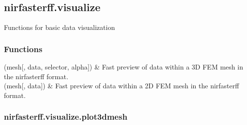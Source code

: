 \documentclass[letterpaper,10pt,english]{sphinxmanual}
\begin{document}
\subsection{nirfasterff.visualize}
\label{\detokenize{_autosummary/nirfasterff.visualize:module-nirfasterff.visualize}}\label{\detokenize{_autosummary/nirfasterff.visualize:nirfasterff-visualize}}\label{\detokenize{_autosummary/nirfasterff.visualize::doc}}
\sphinxAtStartPar
Functions for basic data visualization
\subsubsection*{Functions}


\begin{savenotes}\sphinxattablestart
\sphinxthistablewithglobalstyle
\sphinxthistablewithnovlinesstyle
\centering
\begin{tabulary}{\linewidth}[t]{}
\sphinxtoprule
\sphinxtableatstartofbodyhook
\sphinxAtStartPar
{\hyperref[\detokenize{_autosummary/nirfasterff.visualize.plot3dmesh:nirfasterff.visualize.plot3dmesh}]{}}(mesh{[}, data, selector, alpha{]})
&
\sphinxAtStartPar
Fast preview of data within a 3D FEM mesh in the nirfasterff format.
\\
\sphinxhline
\sphinxAtStartPar
{\hyperref[\detokenize{_autosummary/nirfasterff.visualize.plotimage:nirfasterff.visualize.plotimage}]{}}(mesh{[}, data{]})
&
\sphinxAtStartPar
Fast preview of data within a 2D FEM mesh in the nirfasterff format.
\\
\sphinxbottomrule
\end{tabulary}
\sphinxtableafterendhook\par
\sphinxattableend\end{savenotes}

\sphinxstepscope


\subsubsection{nirfasterff.visualize.plot3dmesh}
\label{\detokenize{_autosummary/nirfasterff.visualize.plot3dmesh:nirfasterff-visualize-plot3dmesh}}\label{\detokenize{_autosummary/nirfasterff.visualize.plot3dmesh::doc}}
\end{document}
